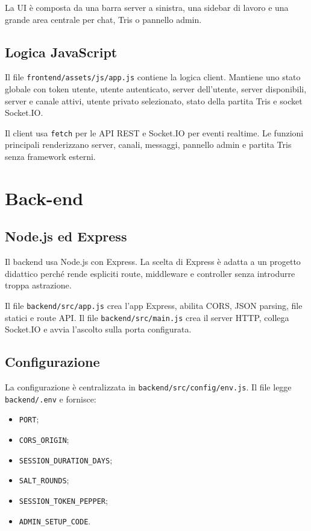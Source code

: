 \documentclass[11pt,a4paper]{article}
\begin{document}
La UI è composta da una barra server a sinistra, una sidebar di lavoro e una grande area centrale per chat, Tris o pannello admin.

\subsection{Logica JavaScript}

Il file \texttt{frontend/assets/js/app.js} contiene la logica client. Mantiene uno stato globale con token utente, utente autenticato, server dell'utente, server disponibili, server e canale attivi, utente privato selezionato, stato della partita Tris e socket Socket.IO.

Il client usa \texttt{fetch} per le API REST e Socket.IO per eventi realtime. Le funzioni principali renderizzano server, canali, messaggi, pannello admin e partita Tris senza framework esterni.

\section{Back-end}

\subsection{Node.js ed Express}

Il backend usa Node.js con Express. La scelta di Express è adatta a un progetto didattico perché rende espliciti route, middleware e controller senza introdurre troppa astrazione.

Il file \texttt{backend/src/app.js} crea l'app Express, abilita CORS, JSON parsing, file statici e route API. Il file \texttt{backend/src/main.js} crea il server HTTP, collega Socket.IO e avvia l'ascolto sulla porta configurata.

\subsection{Configurazione}

La configurazione è centralizzata in \texttt{backend/src/config/env.js}. Il file legge \texttt{backend/.env} e fornisce:

\begin{itemize}
  \item \texttt{PORT};
  \item \texttt{CORS\_ORIGIN};
  \item \texttt{SESSION\_DURATION\_DAYS};
  \item \texttt{SALT\_ROUNDS};
  \item \texttt{SESSION\_TOKEN\_PEPPER};
  \item \texttt{ADMIN\_SETUP\_CODE}.
\end{itemize}
\end{document}

